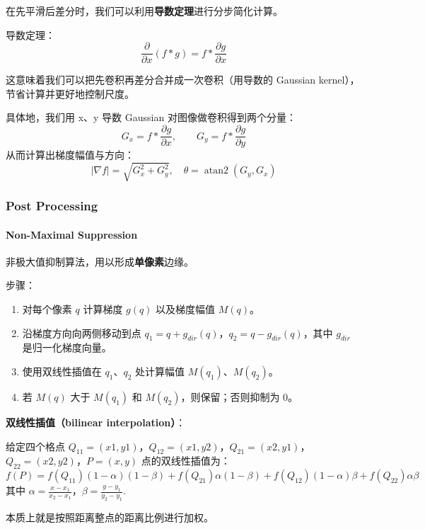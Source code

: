 在先平滑后差分时，我们可以利用\textbf{导数定理}进行分步简化计算。

导数定理： \[
  \frac{\partial}{\partial x}(f * g) = f * \frac{\partial g}{\partial x}
\]

这意味着我们可以把先卷积再差分合并成一次卷积（用导数的 Gaussian
kernel），节省计算并更好地控制尺度。

具体地，我们用 x、y 导数 Gaussian 对图像做卷积得到两个分量： \[
  G_x = f * \frac{\partial g}{\partial x}, \qquad G_y = f * \frac{\partial g}{\partial y}
\] 从而计算出梯度幅值与方向： \[
  |\nabla f| = \sqrt{G_x^2 + G_y^2}, \quad \theta = \operatorname{atan2} (G_y, G_x)
\]

\subsubsection{Post Processing}\label{post-processing}

\paragraph{Non-Maximal Suppression}\label{non-maximal-suppression}

非极大值抑制算法，用以形成\textbf{单像素}边缘。

步骤：

\begin{enumerate}
  \def\labelenumi{\arabic{enumi}.}
  \tightlist
  \item
        对每个像素 \(q\) 计算梯度 \(g(q)\) 以及梯度幅值 \(M(q)\)。
  \item
        沿梯度方向向两侧移动到点
        \(q_1 = q + g_{dir}(q)\)，\(q_2 = q   - g_{dir}(q)\)，其中 \(g_{dir}\)
        是归一化梯度向量。
  \item
        使用双线性插值在 \(q_1\)、\(q_2\) 处计算幅值 \(M(q_1)\)、\(M(q_2)\)。
  \item
        若 \(M(q)\) 大于 \(M(q_1)\) 和 \(M(q_2)\)，则保留；否则抑制为 0。
\end{enumerate}

\textbf{双线性插值（bilinear interpolation）}：

给定四个格点
\(Q_{11}=(x1, y1)\)，\(Q_{12}=(x1, y2)\)，\(Q_{21}=(x2, y1)\)，\(Q_{22}=(x2, y2)\)，\(P=(x, y)\)
点的双线性插值为： \[
  f(P) = f(Q_{11}) (1-\alpha)(1-\beta) + f(Q_{21}) \alpha (1-\beta) + f(Q_{12}) (1-\alpha)\beta + f(Q_{22}) \alpha \beta
\] 其中
\(\alpha = \frac{x   - x_1}{x_2   - x_1}\)，\(\beta = \frac{y   - y_1}{y_2   - y_1}\).

本质上就是按照距离整点的距离比例进行加权。

